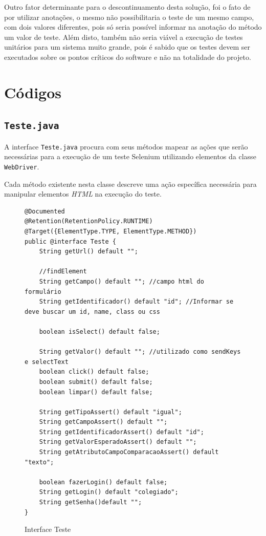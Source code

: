\documentclass[tg]{mdtufsm}
\begin{document}
Outro fator determinante para o descontinuamento desta solução, foi o fato de por utilizar anotações, o mesmo não possibilitaria o teste de um mesmo campo, com dois valores diferentes, pois só seria possível informar na anotação do método um valor de teste. Além disto, também não seria viável a execução de testes unitários para um sistema muito grande, pois é sabido que os testes devem ser executados sobre os pontos críticos do software e não na totalidade do projeto.


\section{Códigos}

\subsection{\texttt{Teste.java}}

A interface \texttt{Teste.java} procura com seus métodos mapear as ações que serão necessárias para a execução de um teste Selenium utilizando elementos da classe \texttt{WebDriver}. 

Cada método existente nesta classe descreve uma ação específica necessária para manipular elementos \emph{HTML} na execução do teste.

\begin{figure}[!htt]
\begin{lstlisting}
@Documented
@Retention(RetentionPolicy.RUNTIME)
@Target({ElementType.TYPE, ElementType.METHOD})
public @interface Teste {
    String getUrl() default "";

    //findElement
    String getCampo() default ""; //campo html do formulário
    String getIdentificador() default "id"; //Informar se deve buscar um id, name, class ou css

    boolean isSelect() default false;

    String getValor() default ""; //utilizado como sendKeys e selectText
    boolean click() default false;
    boolean submit() default false;
    boolean limpar() default false;

    String getTipoAssert() default "igual";
    String getCampoAssert() default "";
    String getIdentificadorAssert() default "id";
    String getValorEsperadoAssert() default "";
    String getAtributoCampoComparacaoAssert() default "texto";

    boolean fazerLogin() default false;
    String getLogin() default "colegiado";
    String getSenha()default "";
}
\end{lstlisting}
	\caption{Interface Teste}
	\label{code:Teste.java}
\end{figure}
\end{document}
